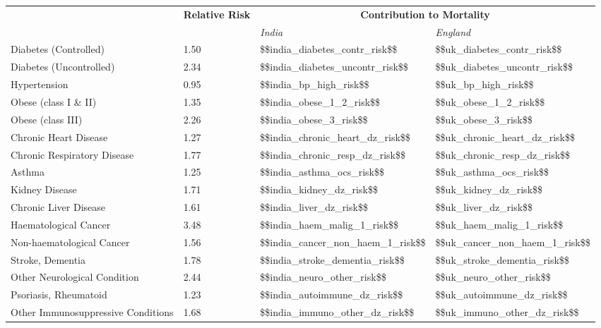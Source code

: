 \begin{tabular}{p{6cm}p{1.5cm}p{2cm}p{2cm}}
& \textbf{Relative \newline Risk} & \multicolumn{2}{c}{\textbf{Contribution to Mortality}} \\[-1.5ex]
& & \emph{India} & \emph{England} \\[2ex]
Diabetes (Controlled) & \num{1.50} & \num{$$india_diabetes_contr_risk$$} & \num{$$uk_diabetes_contr_risk$$} \\[0.25ex]
Diabetes (Uncontrolled) & \num{2.34} & \num{$$india_diabetes_uncontr_risk$$} & \num{$$uk_diabetes_uncontr_risk$$} \\[0.25ex]
Hypertension & \num{0.95} & \num{$$india_bp_high_risk$$} & \num{$$uk_bp_high_risk$$} \\[0.25ex]
Obese (class I \& II) & \num{1.35} & \num{$$india_obese_1_2_risk$$} & \num{$$uk_obese_1_2_risk$$} \\[0.25ex]
Obese (class III) & \num{2.26} & \num{$$india_obese_3_risk$$} & \num{$$uk_obese_3_risk$$} \\[0.25ex]
Chronic Heart Disease & \num{1.27} & \num{$$india_chronic_heart_dz_risk$$} & \num{$$uk_chronic_heart_dz_risk$$} \\[0.25ex]
Chronic Respiratory Disease & \num{1.77} & \num{$$india_chronic_resp_dz_risk$$} & \num{$$uk_chronic_resp_dz_risk$$} \\[0.25ex]
Asthma & \num{1.25} & \num{$$india_asthma_ocs_risk$$} & \num{$$uk_asthma_ocs_risk$$} \\[0.25ex]
Kidney Disease & \num{1.71} & \num{$$india_kidney_dz_risk$$} & \num{$$uk_kidney_dz_risk$$} \\[0.25ex]
Chronic Liver Disease & \num{1.61} & \num{$$india_liver_dz_risk$$} & \num{$$uk_liver_dz_risk$$} \\[0.25ex]
Haematological Cancer & \num{3.48} & \num{$$india_haem_malig_1_risk$$} & \num{$$uk_haem_malig_1_risk$$} \\[0.25ex]
Non-haematological Cancer & \num{1.56} & \num{$$india_cancer_non_haem_1_risk$$} & \num{$$uk_cancer_non_haem_1_risk$$} \\[0.25ex]
Stroke, Dementia & \num{1.78} & \num{$$india_stroke_dementia_risk$$} & \num{$$uk_stroke_dementia_risk$$} \\[0.25ex]
Other Neurological Condition & \num{2.44} & \num{$$india_neuro_other_risk$$} & \num{$$uk_neuro_other_risk$$} \\[0.25ex]
Psoriasis, Rheumatoid & \num{1.23} & \num{$$india_autoimmune_dz_risk$$} & \num{$$uk_autoimmune_dz_risk$$} \\[0.25ex]
Other Immunosuppressive Conditions & \num{1.68} & \num{$$india_immuno_other_dz_risk$$} & \num{$$uk_immuno_other_dz_risk$$} \\[0.25ex]
\end{tabular}

